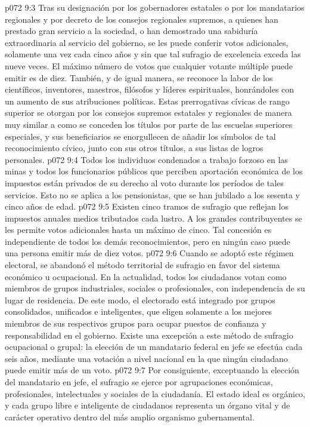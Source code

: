 \vs p072 9:3 Tras su designación por los gobernadores estatales o por los mandatarios regionales y por decreto de los consejos regionales supremos, a quienes han prestado gran servicio a la sociedad, o han demostrado una sabiduría extraordinaria al servicio del gobierno, se les puede conferir votos adicionales, solamente una vez cada cinco años y sin que tal sufragio de excelencia exceda las nueve veces. El máximo número de votos que cualquier votante múltiple puede emitir es de diez. También, y de igual manera, se reconoce la labor de los científicos, inventores, maestros, filósofos y líderes espirituales, honrándoles con un aumento de sus atribuciones políticas. Estas prerrogativas cívicas de rango superior se otorgan por los consejos supremos estatales y regionales de manera muy similar a como se conceden los títulos por parte de las escuelas superiores especiales, y sus beneficiarios se enorgullecen de añadir los símbolos de tal reconocimiento cívico, junto con sus otros títulos, a sus listas de logros personales.
\vs p072 9:4 Todos los individuos condenados a trabajo forzoso en las minas y todos los funcionarios públicos que perciben aportación económica de los impuestos están privados de su derecho al voto durante los períodos de tales servicios. Esto no se aplica a los pensionistas, que se han jubilado a los sesenta y cinco años de edad.
\vs p072 9:5 Existen cinco tramos de sufragio que reflejan los impuestos anuales medios tributados cada lustro. A los grandes contribuyentes se les permite votos adicionales hasta un máximo de cinco. Tal concesión es independiente de todos los demás reconocimientos, pero en ningún caso puede una persona emitir más de diez votos.
\vs p072 9:6 Cuando se adoptó este régimen electoral, se abandonó el método territorial de sufragio en favor del sistema económico u ocupacional. En la actualidad, todos los ciudadanos votan como miembros de grupos industriales, sociales o profesionales, con independencia de su lugar de residencia. De este modo, el electorado está integrado por grupos consolidados, unificados e inteligentes, que eligen solamente a los mejores miembros de sus respectivos grupos para ocupar puestos de confianza y responsabilidad en el gobierno. Existe una excepción a este método de sufragio ocupacional o grupal: la elección de un mandatario federal en jefe se efectúa cada seis años, mediante una votación a nivel nacional en la que ningún ciudadano puede emitir más de un voto.
\vs p072 9:7 \pc Por consiguiente, exceptuando la elección del mandatario en jefe, el sufragio se ejerce por agrupaciones económicas, profesionales, intelectuales y sociales de la ciudadanía. El estado ideal es orgánico, y cada grupo libre e inteligente de ciudadanos representa un órgano vital y de carácter operativo dentro del más amplio organismo gubernamental.
